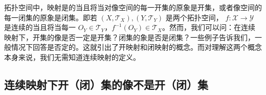 
拓扑空间中，映射是的当且将当对像空间的每一开集的原象是开集，或者像空间的每一闭集的原象是闭集。即若 $(X,\mathcal T_X),(Y,\mathcal T_Y)$ 是两个拓扑空间， $f:\mathcal X\rightarrow\mathcal Y$ 是连续的当且将当每一 $O_Y\in\mathcal T_Y$，$f^{-1}(O_Y)\in\mathcal T_X$。然而，我们可以问：在连续映射下，开集的像是否一定是开集？闭集的象是否是闭集？一些例子告诉我们，一般情况下回答是否定的。这就引出了开映射和闭映射的概念。而对理解这两个概念本身来说，我们无需知道连续映射的定义。

\subsection{连续映射下开（闭）集的像不是开（闭）集}



